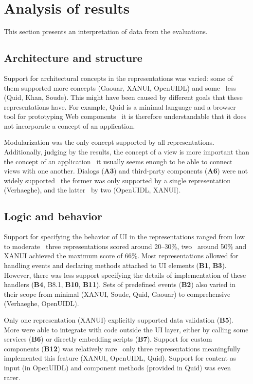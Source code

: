 \section{Analysis of results}\label{sec:analysis-of-results}
This section presents an interpretation of data from the evaluations.

\subsection{Architecture and structure}\label{subsec:4-2-architecture-and-structure}
Support for architectural concepts in the representations was varied: some of them supported more concepts (Gaouar, XANUI, OpenUIDL) and some \textendash\ less (Quid, Khan, Soude).
This might have been caused by different goals that these representations have.
For example, Quid is a minimal language and a browser tool for prototyping Web components \textendash\ it is therefore understandable that it does not incorporate a concept of an application.

Modularization was the only concept supported by all representations.
Additionally, judging by the results, the concept of a view is more important than the concept of an application \textendash\ it usually seems enough to be able to connect views with one another.
Dialogs (\textbf{A3}) and third-party components (\textbf{A6}) were not widely supported \textendash\ the former was only supported by a single representation (Verhaeghe), and the latter \textendash\ by two (OpenUIDL, XANUI).

\subsection{Logic and behavior}\label{subsec:4-2-logic-and-behavior}
Support for specifying the behavior of UI in the representations ranged from low to moderate \textendash\ three representations scored around 20--30\%, two \textendash\ around 50\% and XANUI achieved the maximum score of 66\%.
Most representations allowed for handling events and declaring methods attached to UI elements (\textbf{B1}, \textbf{B3}).
However, there was less support specifying the details of implementation of these handlers (\textbf{B4}, B8.1, \textbf{B10}, \textbf{B11}).
Sets of predefined events (\textbf{B2}) also varied in their scope from minimal (XANUI, Soude, Quid, Gaouar) to comprehensive (Verhaeghe, OpenUIDL).

Only one representation (XANUI) explicitly supported data validation (\textbf{B5}).
More were able to integrate with code outside the UI layer, either by calling some services (\textbf{B6}) or directly embedding scripts (\textbf{B7}).
Support for custom components (\textbf{B12}) was relatively rare \textendash\ only three representations meaningfully implemented this feature (XANUI, OpenUIDL, Quid).
Support for content as input (in OpenUIDL) and component methods (provided in Quid) was even rarer.

